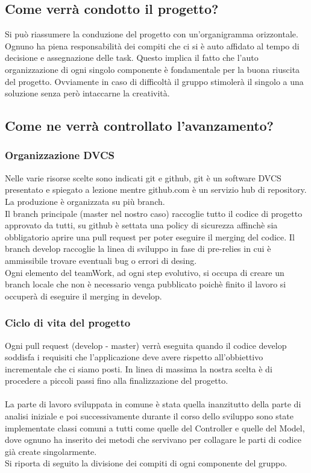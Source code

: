 \documentclass[a4paper,12pt]{report}
\begin{document}
\subsection{Come verrà condotto il progetto?}
Si può riassumere la conduzione del progetto con un'organigramma orizzontale.
Ognuno ha piena responsabilità dei compiti che ci si è auto affidato al tempo di decisione e assegnazione delle task.
Questo implica il fatto che l'auto organizzazione di ogni singolo componente è fondamentale per la buona riuscita del progetto.
Ovviamente in caso di difficoltà il gruppo stimolerà il singolo a una soluzione senza però intaccarne la creatività.
\subsection{Come ne verrà controllato l'avanzamento?}
\subsubsection{Organizzazione DVCS}
Nelle varie risorse scelte sono indicati git e github, git è un software DVCS presentato e spiegato a lezione mentre github.com è un servizio
hub di repository.
La produzione è organizzata su più branch.
\\Il branch principale (master nel nostro caso) raccoglie tutto il codice di progetto approvato da tutti, su github è settata una policy
di sicurezza affinchè sia obbligatorio aprire una pull request per poter eseguire il merging del codice.
Il branch develop raccoglie la linea di sviluppo in fase di pre-relies in cui è ammissibile trovare eventuali bug o errori di desing.
\\Ogni elemento del teamWork, ad ogni step evolutivo, si occupa di creare un branch locale che non è necessario venga pubblicato poichè finito
il lavoro si occuperà di eseguire il merging  in develop.
\subsubsection{Ciclo di vita del progetto}
Ogni pull request (develop - master) verrà eseguita quando il codice develop soddisfa i requisiti che l'applicazione deve avere rispetto
all'obbiettivo incrementale che ci siamo posti.
In linea di massima la nostra scelta è di procedere a piccoli passi fino alla finalizzazione del progetto.\\
\\La parte di lavoro sviluppata in comune è stata quella inanzitutto della parte di analisi iniziale e poi successivamente durante il corso dello sviluppo
sono state implementate classi comuni a tutti come quelle del Controller e quelle del Model, dove ognuno ha inserito dei metodi che servivano per collagare
le parti di codice già create singolarmente.
\\Si riporta di seguito la divisione dei compiti di ogni componente del gruppo.
\end{document}
